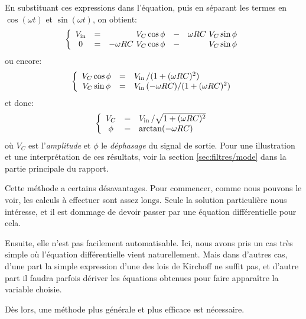 En substituant ces expressions dans l'équation,
puis en séparant les termes en $\cos(\omega t)$ et $\sin(\omega t)$,
on obtient:
\begin{equation}
    \left\{
        \begin{array}{ccrcr}
            V\ind{in} &=& V_C\cos\phi &-& \omega RC\ V_C\sin\phi \\
            0 &=& -\omega RC\ V_C\cos\phi &-& V_C\sin\phi
        \end{array}
    \right.
\end{equation}
ou encore:
\begin{equation}
    \left\{
        \begin{array}{ccl}
            V_C\cos\phi &=& V_{\mathrm{in}}\,/(1+(\omega RC)^2) \\
            V_C\sin\phi &=& V_{\mathrm{in}}\,(-\omega RC) / (1+(\omega RC)^2)
        \end{array}
    \right.
\end{equation}
et donc:
\begin{equation}
    \left\{
        \begin{array}{ccl}
            V_C &=& V_{\mathrm{in}}\,/ \sqrt{1+(\omega RC)^2} \\
            \phi &=& \arctan(-\omega RC)
        \end{array}
    \right.
\end{equation}
où $V_C$ est l'\emph{amplitude} et $\phi$ le \emph{déphasage}
du signal de sortie.
Pour une illustration et une interprétation de ces résultats,
voir la section \ref{sec:filtres/mode} dans la partie principale du rapport.

Cette méthode a certains désavantages.
Pour commencer, comme nous pouvons le voir, les calculs à effectuer
sont assez longs.
Seule la solution particulière nous intéresse,
et il est dommage de devoir passer par une équation différentielle pour cela.

Ensuite, elle n'est pas facilement automatisable.
Ici, nous avons pris un cas très simple où l'équation différentielle
vient naturellement.
Mais dans d'autres cas,
d'une part la simple expression d'une
des lois de Kirchoff ne suffit pas,
et d'autre part il faudra parfois dériver les équations
obtenues pour faire apparaître la variable choisie.

Dès lors, une méthode plus générale et plus efficace est nécessaire.
